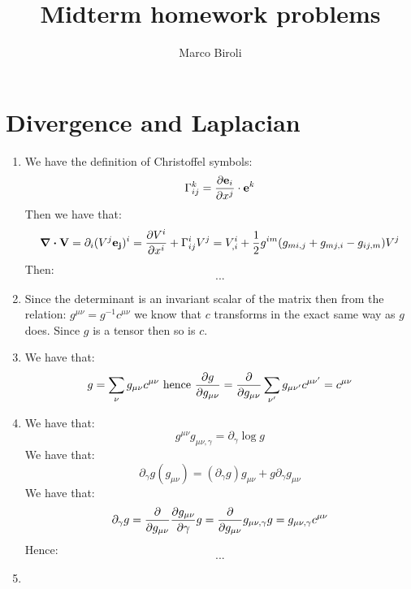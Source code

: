 \documentclass[10pt,a4paper]{article}
\author{Marco Biroli}
\title{Midterm homework problems}
\begin{document}
\maketitle

\section{Divergence and Laplacian}

\begin{enumerate}

\item We have the definition of Christoffel symbols:
\[
\Gamma_{ij}^k = \pdv{\vb{e}_i}{x^j} \cdot \vb{e}^k
\]
Then we have that:
\[
\div \vb{V} = \partial_i ( V^j \vb{e_j})^i = \pdv{V^i}{x^i} + \Gamma^i_{i j} V^j = V^i_{, i} + \frac{1}{2} g^{im} ( g_{mi, j} + g_{mj, i} - g_{i j, m} ) V^j
\]
Then:
\[
...
\]

\item Since the determinant is an invariant scalar of the matrix then from the relation: $g^{\mu\nu} = g^{-1} c^{\mu \nu}$ we know that $c$ transforms in the exact same way as $g$ does. Since $g$ is a tensor then so is $c$. 

\item We have that:
\[
g = \sum_\nu g_{\mu \nu} c^{\mu \nu} \mbox{~hence~} \pdv{g}{g_{\mu \nu}} = \pdv{}{g_{\mu \nu}} \sum_{\nu'} g_{\mu \nu'} c^{\mu \nu'} = c^{\mu \nu}
\]

\item We have that:
\[
g^{\mu \nu} g_{\mu \nu, \gamma} = \partial_\gamma \log g 
\]
We have that:
\[
\partial_\gamma g (g_{\mu \nu}) = (\partial_\gamma g) g_{\mu \nu} + g \partial_\gamma g_{\mu \nu} 
\]
We have that:
\[
\partial_\gamma g = \pdv{}{g_{\mu \nu}} \pdv{g_{\mu \nu}}{\gamma} g = \pdv{}{g_{\mu \nu}} g_{\mu \nu, \gamma} g = g_{\mu \nu, \gamma} c^{\mu \nu}
\]
Hence:
\[
...
\]

\item 

\end{enumerate}
\end{document}
